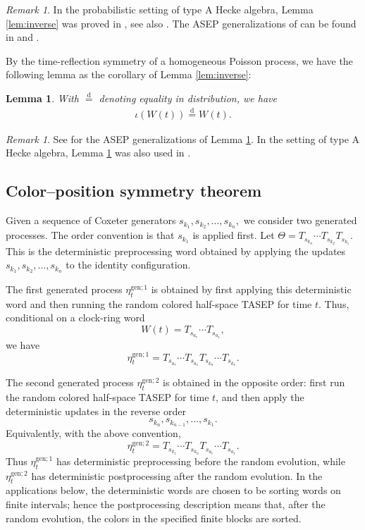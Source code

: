 \documentclass[12pt,a4paper]{amsart}
\newtheorem{lemma}[theorem]{Lemma}
\theoremstyle{remark}
\newtheorem{remark}[theorem]{Remark}
\numberwithin{equation}{section} \numberwithin{theorem}{section}
\begin{document}
\begin{remark}
In the probabilistic setting of type A Hecke algebra, Lemma \ref{lem:inverse} was proved in \cite[Lemma 2.1]{AHR09}, see also \cite[Theorem 2.1]{BF22}. The ASEP generalizations of \cite[Lemma 2.1]{AHR09} can be found in \cite[Lemma 3.1]{AAV11} and \cite[Theorem 2.2]{BB21}.
\end{remark}

By the time-reflection symmetry of a homogeneous Poisson process, we have the following lemma as the corollary of Lemma \ref{lem:inverse}:
\begin{lemma}
\label{lem:d-equality}
With $\overset{\text{d}}{=}$ denoting equality in distribution, we have 
\begin{align}
\iota(W(t)) \overset{\text{d}}{=} W(t).
\end{align}
\end{lemma}

\begin{remark}
See \cite[Lemma 3.4]{HS23} for the ASEP generalizations of Lemma \ref{lem:d-equality}. In the setting of type A Hecke algebra, Lemma \ref{lem:d-equality} was also used in \cite{AAV11,BB21,BF22,BN22}.
\end{remark}


\subsection{Color--position symmetry theorem}
\label{ssec:Symmetry-theorem}

Given a sequence of Coxeter generators
$
s_{k_1},s_{k_2},\ldots,s_{k_n},
$
we consider two generated processes. 
The order convention is that $s_{k_1}$ is applied first.
Let
$
\Theta=T_{s_{k_n}}\cdots T_{s_{k_2}}T_{s_{k_1}}.
$
This is the deterministic preprocessing word obtained by applying the updates
$s_{k_1},s_{k_2},\ldots,s_{k_n}$ to the identity configuration.

The first generated process $\eta_t^{\mathrm{gen};1}$ is obtained by first applying this deterministic word and then running the random colored half-space TASEP for time $t$. 
Thus, conditional on a clock-ring word
\[
W(t)=T_{s_{a_r}}\cdots T_{s_{a_1}},
\]
we have
\[
\eta_t^{\mathrm{gen};1}
=
T_{s_{a_r}}\cdots T_{s_{a_1}}
T_{s_{k_n}}\cdots T_{s_{k_1}}.
\]

The second generated process $\eta_t^{\mathrm{gen};2}$ is obtained in the opposite order: first run the random colored half-space TASEP for time $t$, and then apply the deterministic updates in the reverse order
\[
s_{k_n},s_{k_{n-1}},\ldots,s_{k_1}.
\]
Equivalently, with the above convention,
\[
\eta_t^{\mathrm{gen};2}
=
T_{s_{k_1}}\cdots T_{s_{k_n}}
T_{s_{a_r}}\cdots T_{s_{a_1}}.
\]
Thus $\eta_t^{\mathrm{gen};1}$ has deterministic preprocessing before the random evolution, while $\eta_t^{\mathrm{gen};2}$ has deterministic postprocessing after the random evolution. 
In the applications below, the deterministic words are chosen to be sorting words on finite intervals; hence the postprocessing description means that, after the random evolution, the colors in the specified finite blocks are sorted.
\end{document}
